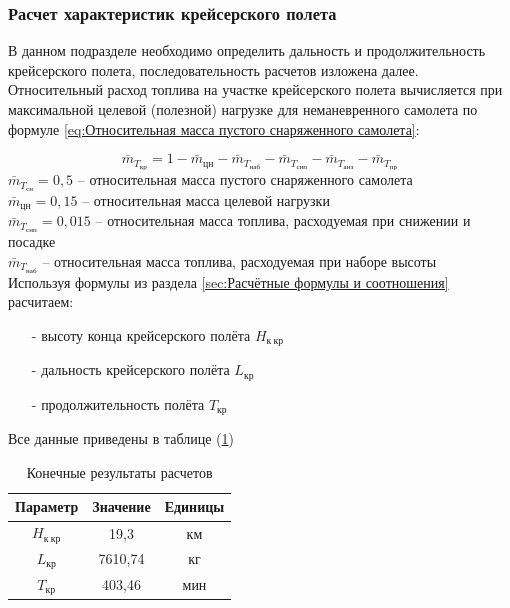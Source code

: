 \subsubsection{Расчет характеристик крейсерского полета}
\label{sec: Расчет характеристик крейсерского полета}

В данном подразделе необходимо определить дальность и
продолжительность крейсерского полета, последовательность расчетов
изложена далее.
Относительный расход топлива на участке крейсерского полета вычисляется
при максимальной целевой (полезной) нагрузке для неманевренного самолета
по формуле \ref{eq:Относительная масса пустого снаряженного самолета}: 

\begin{equation}
    \label{eq:Относительная масса пустого снаряженного самолета}
    \bar{m}_{T_\text{кр}} = 1 - \bar{m}_{\text{цн}} - \bar{m}_{T_\text{наб}} - \bar{m}_{T_\text{снп}} - \bar{m}_{T_\text{анз}} - \bar{m}_{T_\text{пр}}
\end{equation}
$\bar{m}_{T_\text{сн}} = 0,5$ -- относительная масса пустого снаряженного самолета \\ 
$\bar{m}_{\text{цн}} = 0,15$ -- относительная масса целевой нагрузки \\ 
$\bar{m}_{T_\text{снп}} = 0,015$ -- относительная масса топлива, расходуемая при снижении и
посадке \\ 
$\bar{m}_{T_\text{наб}}$ --  относительная масса топлива,
расходуемая при наборе высоты \\

Используя формулы из раздела \ref{sec:Расчётные формулы и соотношения} расчитаем: 

\begin{itemize}
    \item [-] высоту конца крейсерского полёта $H_{\text{к} \ \text{кр}}$
    \item [-] дальность крейсерского полёта $L_\text{кр}$
    \item [-] продолжительность полёта $T_\text{кр}$
\end{itemize}
Все данные приведены в таблице (\ref{tab:Крейсер})

\begin{table}[H]
    \centering
    \caption{Конечные результаты расчетов}
    \begin{tabular}{|c|c|c|}
    \hline
        Параметр & Значение &Единицы\\ \hline
        $H_{\text{к} \ \text{кр}}$ & 19,3&км\\ \hline
        $L_\text{кр}$ & 7610,74 &кг\\ \hline
        $T_\text{кр}$ & 403,46 &мин\\ \hline
    \end{tabular}
    \label{tab:Крейсер}
\end{table}


